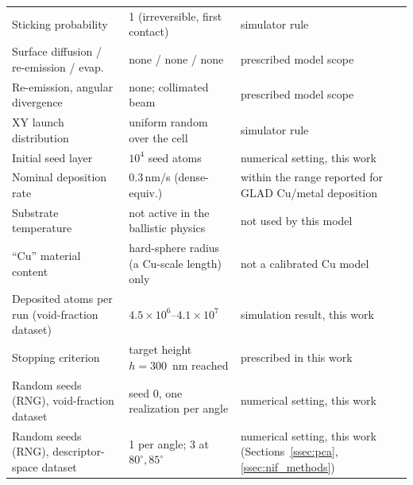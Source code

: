 \documentclass[aip,amsmath,amssymb,reprint]{revtex4-1}
\begin{document}
\begin{table}[htbp]
\begin{tabular}{lll}
    \parbox{0.34\linewidth}{Sticking probability} & \parbox{0.28\linewidth}{1 (irreversible, first contact)} & \parbox{0.24\linewidth}{simulator rule} \\
    \parbox{0.34\linewidth}{Surface diffusion / re-emission / evap.} & \parbox{0.28\linewidth}{none / none / none} & \parbox{0.24\linewidth}{prescribed model scope} \\
    \parbox{0.34\linewidth}{Re-emission, angular divergence} & \parbox{0.28\linewidth}{none; collimated beam} & \parbox{0.24\linewidth}{prescribed model scope} \\
    \parbox{0.34\linewidth}{XY launch distribution} & \parbox{0.28\linewidth}{uniform random over the cell} & \parbox{0.24\linewidth}{simulator rule} \\
    \parbox{0.34\linewidth}{Initial seed layer} & \parbox{0.28\linewidth}{$10^{4}$ seed atoms} & \parbox{0.24\linewidth}{numerical setting, this work} \\
    \parbox{0.34\linewidth}{Nominal deposition rate} & \parbox{0.28\linewidth}{0.3\,nm/s (dense-equiv.)} & \parbox{0.24\linewidth}{within the range reported for GLAD Cu/metal deposition \citep{jamnig2019}} \\
    \parbox{0.34\linewidth}{Substrate temperature} & \parbox{0.28\linewidth}{not active in the ballistic physics} & \parbox{0.24\linewidth}{not used by this model} \\
    \parbox{0.34\linewidth}{``Cu'' material content} & \parbox{0.28\linewidth}{hard-sphere radius (a Cu-scale length) only} & \parbox{0.24\linewidth}{not a calibrated Cu model} \\
    \parbox{0.34\linewidth}{Deposited atoms per run (void-fraction dataset)} & \parbox{0.28\linewidth}{$4.5\times10^{6}$--$4.1\times10^{7}$} & \parbox{0.24\linewidth}{simulation result, this work} \\
    \parbox{0.34\linewidth}{Stopping criterion} & \parbox{0.28\linewidth}{target height $h=300$~nm reached} & \parbox{0.24\linewidth}{prescribed in this work} \\
    \parbox{0.34\linewidth}{Random seeds (RNG), void-fraction dataset} & \parbox{0.28\linewidth}{seed 0, one realization per angle} & \parbox{0.24\linewidth}{numerical setting, this work} \\
    \parbox{0.34\linewidth}{Random seeds (RNG), descriptor-space dataset} & \parbox{0.28\linewidth}{1 per angle; 3 at $80^{\circ},85^{\circ}$} & \parbox{0.24\linewidth}{numerical setting, this work (Sections~\ref{ssec:pca}, \ref{ssec:nif_methods})} \\

\end{tabular}
\end{table}
\end{document}
